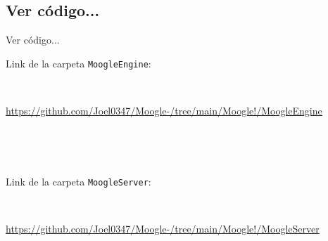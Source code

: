 \subsection{Ver código...}
\begin{frame}[fragile]{Ver código...}

Link de la carpeta \texttt{MoogleEngine}:


\ 


\textcolor{blue}{\underline{\tiny\url{https://github.com/Joel0347/Moogle-/tree/main/Moogle!/MoogleEngine}}}


\ 


\ 


Link de la carpeta \texttt{MoogleServer}:


\ 


\textcolor{blue}{\underline{\tiny\url{https://github.com/Joel0347/Moogle-/tree/main/Moogle!/MoogleServer}}}

\end{frame}
